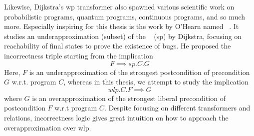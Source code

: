 Likewise, Dijkstra's wp transformer also spawned various scientific work on probabilistic programs, quantum programs, continuous programs, and so much more.
Especially inspiring for this thesis is the work by O'Hearn named ~\cite{ohearn2020IncorrectnessLogic}. 
It studies an underapproximation (subset) of the ~\cite{dijkstra90} (sp) by Dijkstra, focusing on reachability of final states to prove the existence of bugs. 
He proposed the incorrectness triple starting from the implication 
$$F\implies sp.C.G$$
Here, $F$ is an underapproximation of the strongest postcondition of precondition $G$ w.r.t. program $C$, whereas in this thesis, we attempt to study the implication 
$$wlp.C.F\implies G$$ 
where $G$ is an overapproximation of the strongest liberal precondition of postcondition $F$ w.r.t program $C$. 
Despite focusing on different transformers and relations, incorrectness logic gives great intuition on how to approach the overapproximation over wlp.

